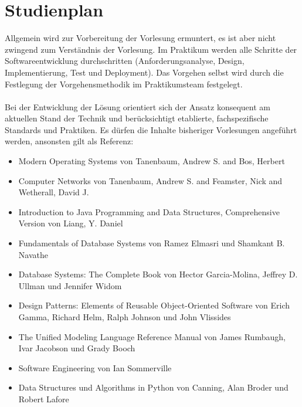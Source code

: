 \section{Studienplan}
Allgemein wird zur Vorbereitung der Vorlesung ermuntert, es ist aber nicht zwingend zum Verständnis der Vorlesung.
Im Praktikum werden alle Schritte der Softwareentwicklung durchschritten (Anforderungsanalyse, Design, Implementierung, Test und Deployment). Das Vorgehen selbst wird durch die Festlegung der Vorgehensmethodik im Praktikumsteam festgelegt.
\\\\
Bei der Entwicklung der Lösung orientiert sich der Ansatz konsequent am aktuellen Stand der Technik und berücksichtigt etablierte, fachspezifische Standards und Praktiken. Es dürfen die Inhalte bisheriger Vorlesungen angeführt werden, ansonsten gilt als Referenz:

\begin{itemize}
    \item Modern Operating Systems von Tanenbaum, Andrew S. and Bos, Herbert \cite{tanenbaum2022modern}
    \item Computer Networks von Tanenbaum, Andrew S. and Feamster, Nick and Wetherall, David J. \cite{tanenbaum2021computer}
    \item Introduction to Java Programming and Data Structures, Comprehensive Version von Liang, Y. Daniel \cite{liang2021java}
    \item Fundamentals of Database Systems von Ramez Elmasri und Shamkant B. Navathe \cite{elmasri_navathe_2021}
    \item Database Systems: The Complete Book von  Hector Garcia-Molina, Jeffrey D. Ullman und Jennifer Widom \cite{garcia_molina_ullman_widom_2011}
    \item Design Patterns: Elements of Reusable Object-Oriented Software von  Erich Gamma, Richard Helm, Ralph Johnson und John Vlissides \cite{gamma1994design}
    \item The Unified Modeling Language Reference Manual  von James Rumbaugh, Ivar Jacobson und Grady Booch \cite{rumbaugh_jacobson_booch_2004}
    \item Software Engineering von  Ian Sommerville \cite{sommerville2015software}
    \item Data Structures und Algorithms in Python von Canning, Alan Broder und Robert Lafore \cite{canning_broder_lafore_2023}
\end{itemize}

